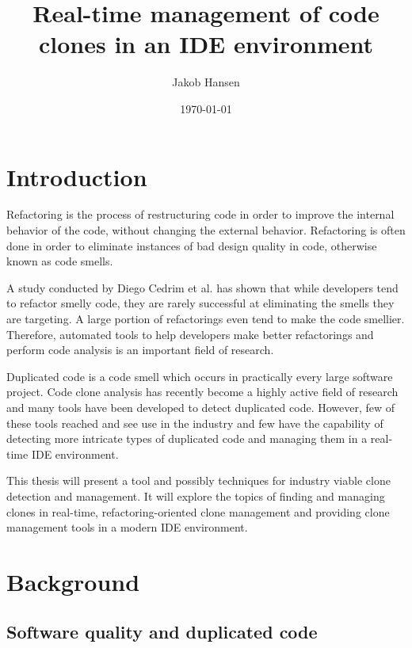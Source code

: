\documentclass[12pt]{article}
\title{\vspace{-20px}Real-time management of code clones in an IDE environment}
\author{Jakob Hansen}
\date{\today}
\begin{document}
\maketitle

\newpage

\tableofcontents

\newpage

\section{Introduction}

Refactoring is the process of restructuring code in order to improve the internal behavior
of the code, without changing the external behavior\cite[9]{fowlerrefactoring}.
Refactoring is often done in order to eliminate instances of bad design quality in code,
otherwise known as code smells.

A study conducted by Diego Cedrim et al. has shown that while developers tend to refactor
smelly code, they are rarely successful at eliminating the smells they are
targeting\cite{Rohit_Gheyi_Impact}. A large portion of refactorings even tend to make the
code smellier. Therefore, automated tools to help developers make better refactorings and
perform code analysis is an important field of research.

Duplicated code is a code smell which occurs in practically every large software project.
Code clone analysis has recently become a highly active field of research and many tools have
been developed to detect duplicated code\cite[7]{Inoue_introduction_to_cc}. However, few of
these tools reached and see use in the industry and few have the capability of detecting
more intricate types of duplicated code and managing them in a real-time IDE environment.

This thesis will present a tool and possibly techniques for industry viable clone
detection and management. It will explore the topics of finding and managing clones in
real-time, refactoring-oriented clone management and providing clone management tools in a
modern IDE environment.

\section{Background}

\subsection{Software quality and duplicated code}
\end{document}
